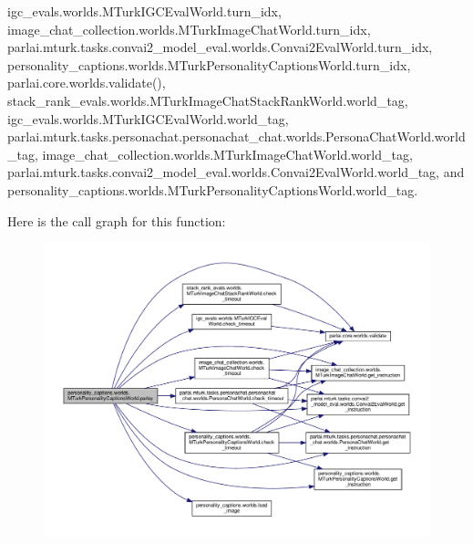igc\+\_\+evals.\+worlds.\+M\+Turk\+I\+G\+C\+Eval\+World.\+turn\+\_\+idx, image\+\_\+chat\+\_\+collection.\+worlds.\+M\+Turk\+Image\+Chat\+World.\+turn\+\_\+idx, parlai.\+mturk.\+tasks.\+convai2\+\_\+model\+\_\+eval.\+worlds.\+Convai2\+Eval\+World.\+turn\+\_\+idx, personality\+\_\+captions.\+worlds.\+M\+Turk\+Personality\+Captions\+World.\+turn\+\_\+idx, parlai.\+core.\+worlds.\+validate(), stack\+\_\+rank\+\_\+evals.\+worlds.\+M\+Turk\+Image\+Chat\+Stack\+Rank\+World.\+world\+\_\+tag, igc\+\_\+evals.\+worlds.\+M\+Turk\+I\+G\+C\+Eval\+World.\+world\+\_\+tag, parlai.\+mturk.\+tasks.\+personachat.\+personachat\+\_\+chat.\+worlds.\+Persona\+Chat\+World.\+world\+\_\+tag, image\+\_\+chat\+\_\+collection.\+worlds.\+M\+Turk\+Image\+Chat\+World.\+world\+\_\+tag, parlai.\+mturk.\+tasks.\+convai2\+\_\+model\+\_\+eval.\+worlds.\+Convai2\+Eval\+World.\+world\+\_\+tag, and personality\+\_\+captions.\+worlds.\+M\+Turk\+Personality\+Captions\+World.\+world\+\_\+tag.

Here is the call graph for this function\+:
\nopagebreak
\begin{figure}[H]
\begin{center}
\leavevmode
\includegraphics[width=350pt]{classpersonality__captions_1_1worlds_1_1MTurkPersonalityCaptionsWorld_ab682688b0f65bc5162cb77f3d96fafc4_cgraph}
\end{center}
\end{figure}
\mbox{\label{classpersonality__captions_1_1worlds_1_1MTurkPersonalityCaptionsWorld_a1fe4b499c8d38e26df4a7921a1672c32}} 
